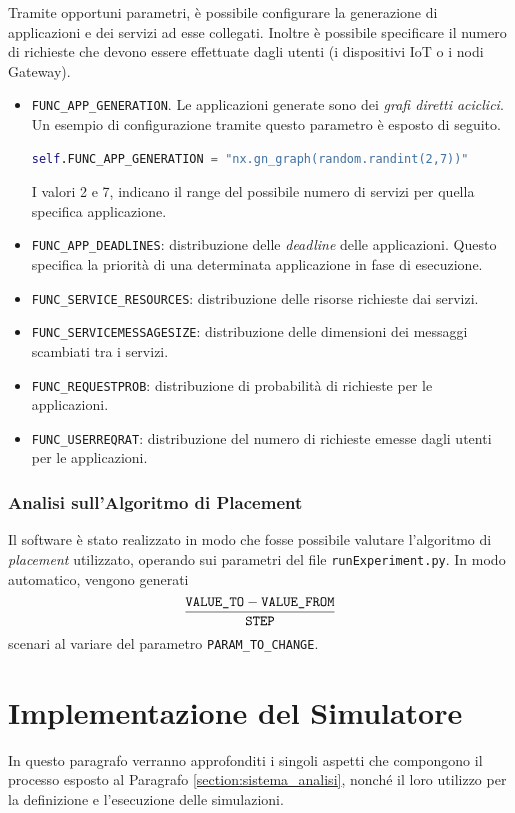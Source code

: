 Tramite opportuni parametri, è possibile configurare la generazione di applicazioni e dei servizi ad esse collegati. Inoltre è possibile specificare il numero di richieste che devono essere effettuate dagli utenti (i dispositivi IoT o i nodi Gateway). 
\begin{itemize}
	\item \texttt{FUNC\_APP\_GENERATION}. Le applicazioni generate sono dei \textit{grafi diretti aciclici}. Un esempio di configurazione tramite questo parametro è esposto di seguito.
		\begin{lstlisting}[language=python]
		self.FUNC_APP_GENERATION = "nx.gn_graph(random.randint(2,7))"
		\end{lstlisting}
		I valori 2 e 7, indicano il range del possibile numero di servizi per quella specifica applicazione.
	\item \texttt{FUNC\_APP\_DEADLINES}: distribuzione delle \textit{deadline} delle applicazioni. Questo specifica la priorità di una determinata applicazione in fase di esecuzione.
	\item \texttt{FUNC\_SERVICE\_RESOURCES}: distribuzione delle risorse richieste dai servizi.
	\item \texttt{FUNC\_SERVICEMESSAGESIZE}: distribuzione delle dimensioni dei messaggi scambiati tra i servizi.
	\item \texttt{FUNC\_REQUESTPROB}: distribuzione di probabilità di richieste per le applicazioni.
	\item \texttt{FUNC\_USERREQRAT}: distribuzione del numero di richieste emesse dagli utenti per le applicazioni.
\end{itemize}

\subsubsection{Analisi sull'Algoritmo di Placement}
Il software è stato realizzato in modo che fosse possibile valutare l'algoritmo di \textit{placement} utilizzato, operando sui parametri del file \texttt{runExperiment.py}. In modo automatico, vengono generati 
		$$\frac{\text{\texttt{VALUE\_TO}} - \text{\texttt{VALUE\_FROM}}}{\text{\texttt{STEP}}}$$
scenari al variare del parametro \texttt{PARAM\_TO\_CHANGE}.

\section{Implementazione del Simulatore}

In questo paragrafo verranno approfonditi i singoli aspetti che compongono il processo esposto al Paragrafo \ref{section:sistema_analisi}, nonché il loro utilizzo per la definizione e l'esecuzione delle simulazioni.

